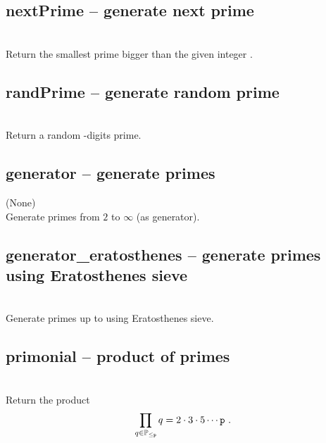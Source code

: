  \subsection{nextPrime -- generate next prime}
   {}{}\\
   \spacing
   \quad Return the smallest prime bigger than the given integer .
   \spacing
%
 \subsection{randPrime -- generate random prime}
   {}{}\\
   \spacing
   \quad Return a random -digits prime.\\
   \spacing
%
 \subsection{generator -- generate primes}
   {(None)}{}\\
   \spacing
   \quad Generate primes from $2$ to $\infty$ (as generator).\\
   \spacing
%
 \subsection{generator\_eratosthenes -- generate primes using Eratosthenes sieve}
   {}{}\\
   \spacing
   \quad Generate primes up to  using Eratosthenes sieve.\\
   \spacing
%
 \subsection{primonial -- product of primes}
   {}{}\\
   \spacing
   \quad Return the product
   \begin{equation*}
   \prod_{q \in \mathbb{P}_{\le \param{p}}} q=2\cdot 3\cdot 5\cdots \param{p}\ .
   \end{equation*}
   \spacing
%
